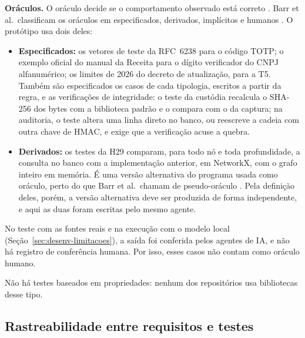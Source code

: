 \textbf{Oráculos.} O oráculo decide se o comportamento observado está
correto \cite[cap.~5, seç.~1.2.7]{swebok4}. Barr et al.\ classificam os
oráculos em especificados, derivados, implícitos e humanos
\cite{barr2015oracle}. O protótipo usa dois deles:
\begin{itemize}
	\item \textbf{Especificados:} os vetores de teste da RFC~6238 para o
	código TOTP; o exemplo oficial do manual da Receita para o dígito
	verificador do CNPJ alfanumérico; os limites de 2026 do decreto de
	atualização, para a T5. Também são especificados os casos de cada
	tipologia, escritos a partir da regra, e as
	verificações de integridade: o teste da custódia recalcula o SHA-256 dos
	bytes com a biblioteca padrão e o compara com o da captura; na auditoria,
	o teste altera uma linha direto no banco, ou reescreve a cadeia com outra
	chave de HMAC, e exige que a verificação acuse a quebra.
	\item \textbf{Derivados:} os testes da H29 comparam, para todo nó e toda
	profundidade, a consulta no banco com a implementação anterior, em
	NetworkX, com o grafo inteiro em memória. É uma versão alternativa do
	programa usada como oráculo, perto do que Barr et al.\ chamam de
	pseudo-oráculo \cite{barr2015oracle}. Pela definição deles, porém, a
	versão alternativa deve ser produzida de forma independente, e aqui as
	duas foram escritas pelo mesmo agente.
\end{itemize}
No teste com as fontes reais e na execução com o modelo local
(Seção~\ref{sec:desenv-limitacoes}), a saída foi conferida pelos agentes de
IA, e não há registro de conferência humana. Por isso, esses casos não contam
como oráculo humano.

Não há testes baseados em propriedades: nenhum dos repositórios usa
bibliotecas desse tipo.

\subsection{Rastreabilidade entre requisitos e testes}
\label{sec:desenv-testes-rastreabilidade}


